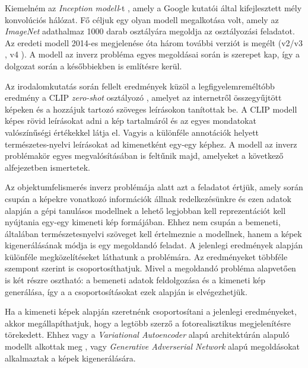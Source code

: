 
Kiemelném az \textit{Inception modell}-t \cite{szegedy2015going}, amely a Google kutatói által kifejlesztett mély konvolúciós hálózat. Fő céljuk egy olyan modell megalkotása volt, amely az \textit{ImageNet} adathalmaz \cite{deng2009imagenet} 1000 darab osztályára megoldja az osztályozási feladatot. Az eredeti modell 2014-es megjelenése óta három további verziót is megélt (v2/v3 \cite{szegedy2016rethinking}, v4 \cite{szegedy2017inception}). A modell az inverz probléma egyes megoldásai során is szerepet kap, így a dolgozat során a későbbiekben is említésre kerül.

Az irodalomkutatás során fellelt eredmények küzöl a legfigyelemreméltóbb eredmény a CLIP \textit{zero-shot} osztályozó \cite{radford2021learning}, amelyet az internetről összegyűjtött képeken és a hozzájuk tartozó szöveges leírásokon tanítottak be. A CLIP modell képes rövid leírásokat adni a kép tartalmáról és az egyes mondatokat valószínűségi értékekkel látja el. Vagyis a különféle annotációk helyett természetes-nyelvi leírásokat ad kimenetként egy-egy képhez. A modell az inverz problémakör egyes megvalósításában is feltűnik majd, amelyeket a következő alfejezetben ismertetek.


Az objektumfelismerés inverz problémája alatt azt a feladatot értjük, amely során csupán a képekre vonatkozó információk állnak redelkezésünkre és ezen adatok alapján a gépi tanulásos modellnek a lehető legjobban kell reprezentációt kell nyújtania egy-egy kimeneti kép formájában.
Ehhez nem csupán a bemeneti, általában természetesnyelvi szöveget kell értelmeznie a modellnek, hanem a képek kigenerálásának módja is egy megoldandó feladat.
A jelenlegi eredmények alapján különféle megközelítéseket láthatunk a problémára. Az eredményeket többféle szempont szerint is csoportosíthatjuk. Mivel a megoldandó probléma alapvetően is két részre osztható: a bemeneti adatok feldolgozása és a kimeneti kép generálása, így a a csoportosításokat ezek alapján is elvégezhetjük.

Ha a kimeneti képek alapján szeretnénk csoportosítani a jelenlegi eredményeket, akkor megállapíthatjuk, hogy a legtöbb szerző a fotorealisztikus megjelenítésre törekedett. Ehhez vagy a \textit{Variational Autoencoder} alapú architektúrán alapuló modellt alkottak meg \cite{ramesh2021zero}, vagy \textit{Generative Adverserial Network} alapú megoldásokat \cite{dong2021unsupervised, reed2016learning, xu2018attngan, zhang2017stackgan} alkalmaztak a képek kigenerálására.

